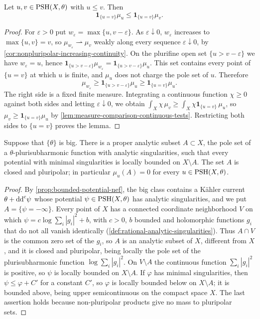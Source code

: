\begin{lemma}\label{lem:ordered-potential-contact-measure}
Let $u,v\in\mathrm{PSH}(X,\theta)$ with $u\leq v$. Then
\[
 \mathbf1_{\{u=v\}}\mu_u\leq\mathbf1_{\{u=v\}}\mu_v.
\]
\end{lemma}
\begin{proof}
For $\varepsilon>0$ put $w_\varepsilon=\max\{u,v-\varepsilon\}$. As $\varepsilon\downarrow0$, $w_\varepsilon$ increases to $\max\{u,v\}=v$, so $\mu_{w_\varepsilon}\rightharpoonup\mu_v$ weakly along every sequence $\varepsilon\downarrow0$, by \cref{cor:nonpluripolar-increasing-continuity}. On the plurifine open set $\{u>v-\varepsilon\}$ we have $w_\varepsilon=u$, hence $\mathbf1_{\{u>v-\varepsilon\}}\mu_{w_\varepsilon}=\mathbf1_{\{u>v-\varepsilon\}}\mu_u$. This set contains every point of $\{u=v\}$ at which $u$ is finite, and $\mu_u$ does not charge the pole set of $u$. Therefore
\[
 \mu_{w_\varepsilon}\geq\mathbf1_{\{u>v-\varepsilon\}}\mu_u
                    \geq\mathbf1_{\{u=v\}}\mu_u.
\]
The right side is a fixed finite measure. Integrating a continuous function $\chi\geq0$ against both sides and letting $\varepsilon\downarrow0$, we obtain $\int_X\chi\,\mu_v\geq\int_X\chi\mathbf1_{\{u=v\}}\,\mu_u$, so $\mu_v\geq\mathbf1_{\{u=v\}}\mu_u$ by \cref{lem:measure-comparison-continuous-tests}. Restricting both sides to $\{u=v\}$ proves the lemma.
\end{proof}

\begin{lemma}\label{lem:big-class-bounded-locus}
Suppose that $\{\theta\}$ is big. There is a proper analytic subset $A\subset X$, the pole set of a $\theta$-plurisubharmonic function with analytic singularities, such that every potential with minimal singularities is locally bounded on $X\setminus A$. The set $A$ is closed and pluripolar; in particular $\mu_u(A)=0$ for every $u\in\mathrm{PSH}(X,\theta)$.
\end{lemma}
\begin{proof}
By \cref{prop:bounded-potential-nef}, the big class contains a K\"ahler current $\theta+\mathrm{dd}^{\mathrm{c}}\psi$ whose potential $\psi\in\mathrm{PSH}(X,\theta)$ has analytic singularities, and we put $A=\{\psi=-\infty\}$. Every point of $X$ has a connected coordinate neighborhood $V$ on which $\psi=c\log\sum_i|g_i|^2+b$, with $c>0$, $b$ bounded and holomorphic functions $g_i$ that do not all vanish identically (\cref{def:rational-analytic-singularities}). Thus $A\cap V$ is the common zero set of the $g_i$, so $A$ is an analytic subset of $X$, different from $X$, and it is closed and pluripolar, being locally the pole set of the plurisubharmonic function $\log\sum_i|g_i|^2$. On $V\setminus A$ the continuous function $\sum_i|g_i|^2$ is positive, so $\psi$ is locally bounded on $X\setminus A$. If $\varphi$ has minimal singularities, then $\psi\leq\varphi+C'$ for a constant $C'$, so $\varphi$ is locally bounded below on $X\setminus A$; it is bounded above, being upper semicontinuous on the compact space $X$. The last assertion holds because non-pluripolar products give no mass to pluripolar sets.
\end{proof}

